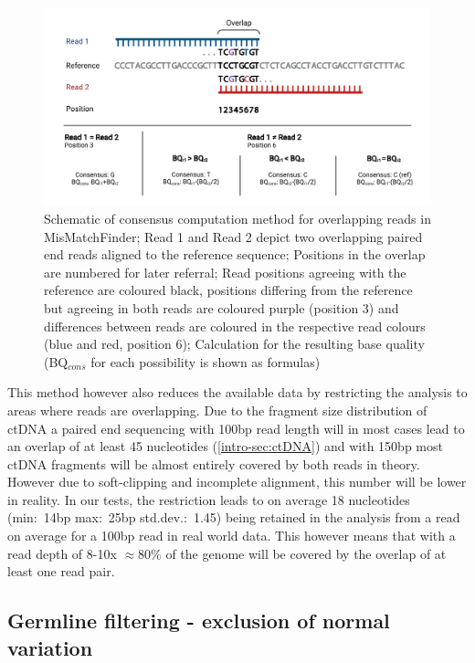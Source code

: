 \begin{figure}[!ht]
\centering
\includegraphics[width=.99\linewidth]{Figures/ConsensusMethodMisMatchFinder.pdf}
\caption[Schematic of consensus computation method for overlapping reads]{Schematic of consensus computation method for overlapping reads in MisMatchFinder; Read 1 and Read 2 depict two overlapping paired end reads aligned to the reference sequence; Positions in the overlap are numbered for later referral; Read positions agreeing with the reference are coloured black, positions differing from the reference but agreeing in both reads are coloured purple (position 3) and differences between reads are coloured in the respective read colours (blue and red, position 6); Calculation for the resulting base quality (BQ$_{cons}$ for each possibility is shown as formulas)}\label{fig:mmf-consensus}
\end{figure}

This method however also reduces the available data by restricting the analysis to areas where reads are overlapping. Due to the fragment size distribution of ctDNA a paired end sequencing with 100bp  read length will in most cases lead to an overlap of at least 45 nucleotides (\autoref{intro-sec:ctDNA}) and with 150bp most ctDNA fragments will be almost entirely covered by both reads in theory. However due to soft-clipping and incomplete alignment, this number will be lower in reality.
In our tests, the restriction leads to on average 18 nucleotides (min:~14bp max:~25bp std.dev.:~1.45) being retained in the analysis from a read on average for a 100bp read in real world data. This however means that with a read depth of 8-10x $\approx$80\% of the genome will be covered by the overlap of at least one read pair.



\subsection[Germline filtering]{Germline filtering - exclusion of normal variation}
\label{mmf-sec:germline}


